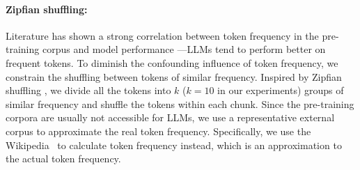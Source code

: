 \documentclass[11pt]{article}
\newcommand{\fzx}[1]{\textbf{\color{blue}[{\bf Zhouxiang}: #1]}}
\newcommand{\aayush}[1]{{\color{green}[{\bf Aayush}: #1]}}
\begin{document}
\paragraph{Zipfian shuffling:}
Literature has shown a strong correlation between token frequency in the pre-training corpus and model performance \citep{razeghi2022impact,mallen2022trustlmretrieval}---LLMs tend to perform better on frequent tokens.
To diminish the confounding influence of token frequency, we constrain the shuffling between tokens of similar frequency.
Inspired by Zipfian shuffling \cite{piantadosi2014zipf},
 we divide all the tokens into $k$ ($k=10$ in our experiments) groups of similar frequency and shuffle the tokens within each chunk. Since the pre-training corpora are usually not accessible for LLMs, we use a representative external corpus to approximate the real token frequency. Specifically, we use the Wikipedia~\cite{wikidump} to calculate token frequency instead, which is an approximation to the actual token frequency.




\end{document}
